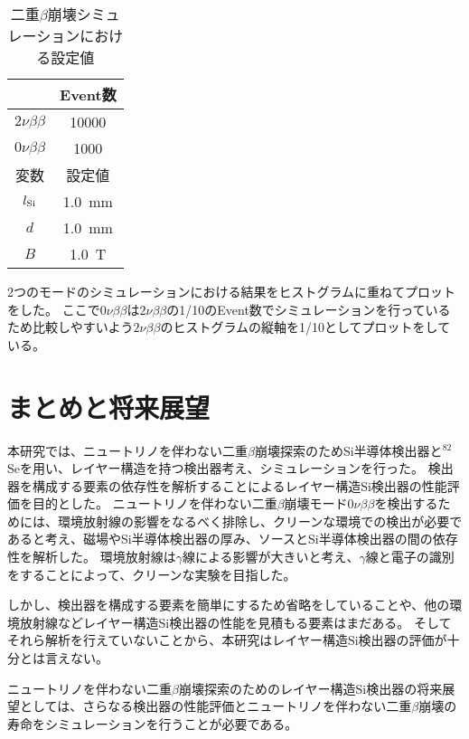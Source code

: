 \documentclass[a4paper,10pt]{jreport}
\begin{document}
\begin{table}[H] 
	\center
	\caption{二重$\beta$崩壊シミュレーションにおける設定値} \label{Tab-DoubleBetaDecay-Settei}
	\begin{tabular}{cc}
	\hline
	 & Event数 \\
	 \hline
	$2\nu\beta\beta$ & 10000 \\
	$0\nu\beta\beta$ & 1000 \\
	\hline
	変数 & 設定値 \\
	$l_{\rm{Si}}$ & \SI{1.0}{mm} \\
	$d$ & \SI{1.0}{mm} \\
	$B$ & \SI{1.0}{T} \\
	\hline
	\end{tabular}
\end{table}

2つのモードのシミュレーションにおける結果をヒストグラムに重ねてプロットをした。
ここで$0\nu\beta\beta$は$2\nu\beta\beta$の1/10のEvent数でシミュレーションを行っているため比較しやすいよう$2\nu\beta\beta$のヒストグラムの縦軸を1/10としてプロットをしている。




\chapter*{まとめと将来展望}

本研究では、ニュートリノを伴わない二重$\beta$崩壊探索のためSi半導体検出器と$^{82}$Seを用い、レイヤー構造を持つ検出器考え、シミュレーションを行った。
検出器を構成する要素の依存性を解析することによるレイヤー構造Si検出器の性能評価を目的とした。
ニュートリノを伴わない二重$\beta$崩壊モード$0\nu\beta\beta$を検出するためには、環境放射線の影響をなるべく排除し、クリーンな環境での検出が必要であると考え、磁場やSi半導体検出器の厚み、ソースとSi半導体検出器の間の依存性を解析した。
環境放射線は$\gamma$線による影響が大きいと考え、$\gamma$線と電子の識別をすることによって、クリーンな実験を目指した。

しかし、検出器を構成する要素を簡単にするため省略をしていることや、他の環境放射線などレイヤー構造Si検出器の性能を見積もる要素はまだある。
そしてそれら解析を行えていないことから、本研究はレイヤー構造Si検出器の評価が十分とは言えない。

ニュートリノを伴わない二重$\beta$崩壊探索のためのレイヤー構造Si検出器の将来展望としては、さらなる検出器の性能評価とニュートリノを伴わない二重$\beta$崩壊の寿命をシミュレーションを行うことが必要である。
\end{document}
